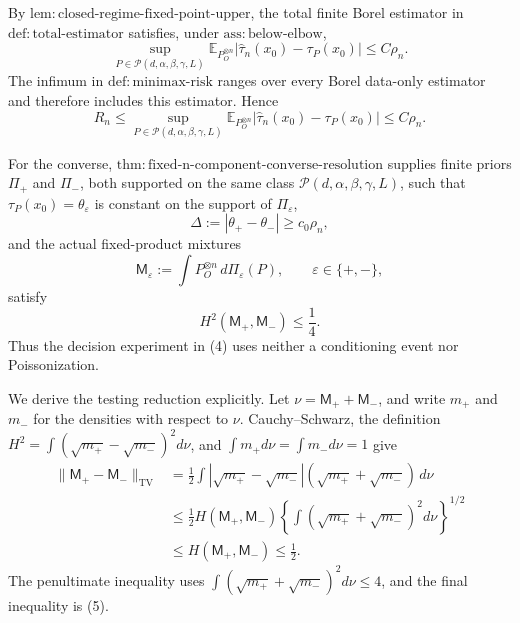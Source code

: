 By \(\mathrm{lem:closed\mbox{-}regime\mbox{-}fixed\mbox{-}point\mbox{-}upper}\), the total finite Borel estimator in \(\mathrm{def:total\mbox{-}estimator}\) satisfies, under \(\mathrm{ass:below\mbox{-}elbow}\),
\[
 \sup_{P\in\mathcal P(d,\alpha,\beta,\gamma,L)}
 \mathbb E_{P_O^{\otimes n}}
 \left|\widehat\tau_n(x_0)-\tau_P(x_0)\right|
 \le C\rho_n.                                                    \tag{1}
\]
The infimum in \(\mathrm{def:minimax\mbox{-}risk}\) ranges over every Borel data-only estimator and therefore includes this estimator.  Hence
\[
 R_n\le
 \sup_{P\in\mathcal P(d,\alpha,\beta,\gamma,L)}
 \mathbb E_{P_O^{\otimes n}}
 \left|\widehat\tau_n(x_0)-\tau_P(x_0)\right|
 \le C\rho_n.                                                    \tag{2}
\]

For the converse, \(\mathrm{thm:fixed\mbox{-}n\mbox{-}component\mbox{-}converse\mbox{-}resolution}\) supplies finite priors \(\Pi_+\) and \(\Pi_-\), both supported on the same class \(\mathcal P(d,\alpha,\beta,\gamma,L)\), such that \(\tau_P(x_0)=\theta_\varepsilon\) is constant on the support of \(\Pi_\varepsilon\),
\[
 \Delta:=|\theta_+-\theta_-|\ge c_0\rho_n,                     \tag{3}
\]
and the actual fixed-product mixtures
\[
 \mathsf M_\varepsilon
 :=\int P_O^{\otimes n}\,d\Pi_\varepsilon(P),
 \qquad \varepsilon\in\{+,-\},                                \tag{4}
\]
satisfy
\[
 H^2(\mathsf M_+,\mathsf M_-)\le\frac14.                       \tag{5}
\]
Thus the decision experiment in (4) uses neither a conditioning event nor Poissonization.

We derive the testing reduction explicitly.  Let \(\nu=\mathsf M_++\mathsf M_-\), and write \(m_+\) and \(m_-\) for the densities with respect to \(\nu\).  Cauchy--Schwarz, the definition \(H^2=\int(\sqrt{m_+}-\sqrt{m_-})^2d\nu\), and \(\int m_+d\nu=\int m_-d\nu=1\) give
\[
\begin{aligned}
 \lVert\mathsf M_+-\mathsf M_-\rVert_{\mathrm{TV}}
 &=\frac12\int|\sqrt{m_+}-\sqrt{m_-}|(\sqrt{m_+}+\sqrt{m_-})\,d\nu\\
 &\le\frac12H(\mathsf M_+,\mathsf M_-)
 \left\{\int(\sqrt{m_+}+\sqrt{m_-})^2d\nu\right\}^{1/2}\\
 &\le H(\mathsf M_+,\mathsf M_-)
 \le\frac12.                                                     \tag{6}
\end{aligned}
\]
The penultimate inequality uses \(\int(\sqrt{m_+}+\sqrt{m_-})^2d\nu\le4\), and the final inequality is (5).

